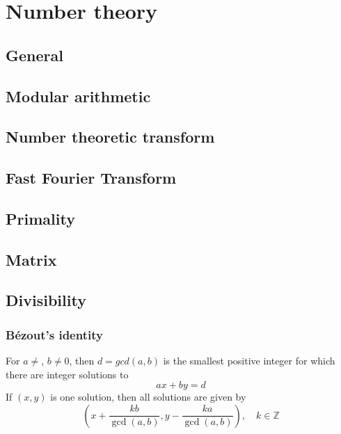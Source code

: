 \chapter{Number theory}

\section{General}

\section{Modular arithmetic}      

\section{Number theoretic transform}

\section{Fast Fourier Transform}

\section{Primality}

\section{Matrix}

\section{Divisibility}

	\subsection{Bézout's identity}
	For $a \neq $, $b \neq 0$, then $d=gcd(a,b)$ is the smallest positive integer for which there are integer solutions to
	$$ax+by=d$$
	If $(x,y)$ is one solution, then all solutions are given by
	$$\left(x+\frac{kb}{\gcd(a,b)}, y-\frac{ka}{\gcd(a,b)}\right), \quad k\in\mathbb{Z}$$



